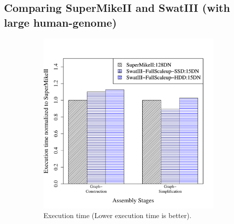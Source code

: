 \documentclass[conference]{IEEEtran}
\begin{document}

\subsection {Comparing SuperMikeII and SwatIII (with large human-genome)} \label{SecPerfDiffArchHum}
\begin{figure}[htb]
        \begin{subfigure}[b]{0.23\textwidth}
                \includegraphics[width=\textwidth]{Figure/PerormanceData/Plots/PerfDiffArchHum.pdf}
                \caption{Execution time (Lower execution time is better).}
                \label{fig:DifferentArchitecturesPerfHum}
        \end{subfigure}
        \begin{subfigure}[b]{0.23\textwidth}

\end{subfigure}
\end{figure}
\end{document}

